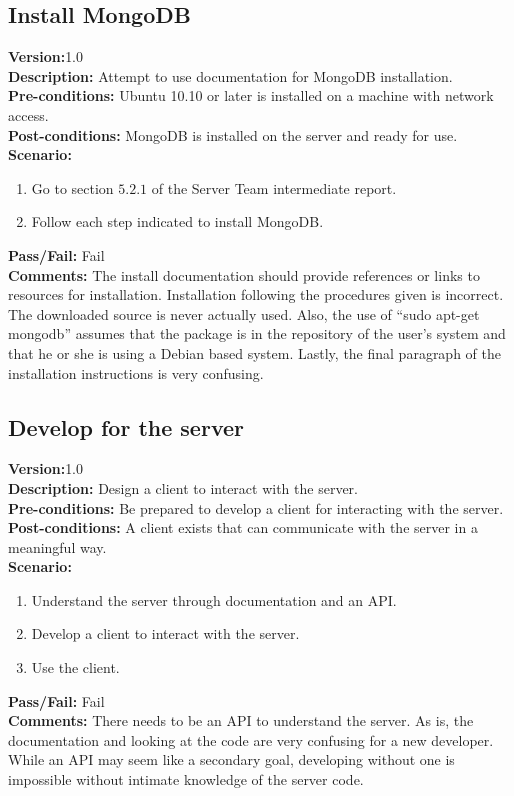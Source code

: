 \documentclass[12pt]{article}
\begin{document}
    \subsection{Install MongoDB}
    \textbf{Version:}1.0\\
    \textbf{Description:} Attempt to use documentation for MongoDB installation.\\
    \textbf{Pre-conditions:} Ubuntu 10.10 or later is installed on a machine with network access.\\
    \textbf{Post-conditions:} MongoDB is installed on the server and ready for use.\\
    \textbf{Scenario:}
    \begin{enumerate}
        \item Go to section $5.2.1$ of the Server Team intermediate report.
        \item Follow each step indicated to install MongoDB.
    \end{enumerate}
    \textbf{Pass/Fail:} Fail\\
    \textbf{Comments:} The install documentation should provide references or links to resources for installation.  Installation following the procedures given is incorrect.  The downloaded source is never actually used.  Also, the use of “sudo apt-get mongodb” assumes that the package is in the repository of the user’s system and that he or she is using a Debian based system.  Lastly, the final paragraph of the installation instructions is very confusing.\\

    \subsection{Develop for the server}
    \textbf{Version:}1.0\\
    \textbf{Description:} Design a client to interact with the server.\\
    \textbf{Pre-conditions:} Be prepared to develop a client for interacting with the server.\\
    \textbf{Post-conditions:} A client exists that can communicate with the server in a meaningful way.\\
    \textbf{Scenario:}
    \begin{enumerate}
        \item Understand the server through documentation and an API.
        \item Develop a client to interact with the server.
        \item Use the client.
    \end{enumerate}
    \textbf{Pass/Fail:} Fail\\
    \textbf{Comments:} There needs to be an API to understand the server.  As is, the documentation and looking at the code are very confusing for a new developer.  While an API may seem like a secondary goal, developing without one is impossible without intimate knowledge of the server code.\\
\end{document}
